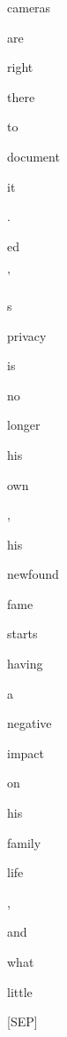 \documentclass[varwidth=150mm]{standalone}
\begin{document}
\begin{CJK*}{UTF8}{gbsn}
{{{\colorbox{red!0.0}{\strut cameras} \colorbox{red!0.0}{\strut are} \colorbox{red!0.0}{\strut right} \colorbox{red!0.0}{\strut there} \colorbox{red!0.0}{\strut to} \colorbox{red!0.0}{\strut document} \colorbox{red!0.0}{\strut it} \colorbox{red!0.0}{\strut .} \colorbox{red!25.018077850341797}{\strut ed} \colorbox{red!1.32755708694458}{\strut '} \colorbox{red!1.2433918714523315}{\strut s} \colorbox{red!1.2326109409332275}{\strut privacy} \colorbox{red!0.0}{\strut is} \colorbox{red!0.0}{\strut no} \colorbox{red!0.0}{\strut longer} \colorbox{red!1.9478707313537598}{\strut his} \colorbox{red!0.0}{\strut own} \colorbox{red!0.0}{\strut ,} \colorbox{red!6.072824001312256}{\strut his} \colorbox{red!0.0}{\strut newfound} \colorbox{red!0.0}{\strut fame} \colorbox{red!2.0670692920684814}{\strut starts} \colorbox{red!0.0}{\strut having} \colorbox{red!0.0}{\strut a} \colorbox{red!0.0}{\strut negative} \colorbox{red!0.0}{\strut impact} \colorbox{red!0.0}{\strut on} \colorbox{red!5.842669486999512}{\strut his} \colorbox{red!0.0}{\strut family} \colorbox{red!0.0}{\strut life} \colorbox{red!0.0}{\strut ,} \colorbox{red!0.0}{\strut and} \colorbox{red!0.0}{\strut what} \colorbox{red!0.0}{\strut little} \colorbox{red!0.0}{\strut [SEP]}
}}}
\end{CJK*}
\end{document}

